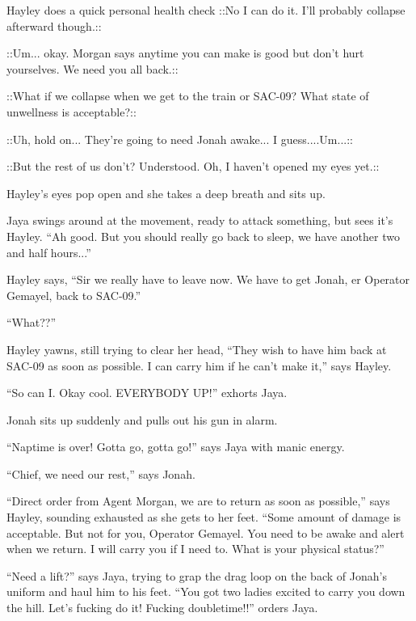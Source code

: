 Hayley does a quick personal health check  {\color[RGB]{230,145,56}::No I can do it.  I'll probably collapse afterward though.::}  {\color[RGB]{255,153,0} } 

 {\color[RGB]{153,0,255}::Um... okay.  Morgan says anytime you can make is good but don't hurt yourselves.  We need you all back.:: } 

 {\color[RGB]{230,145,56}::What if we collapse when we get to the train or SAC-09?  What state of unwellness is acceptable?::}  {\color[RGB]{255,153,0} } 

 {\color[RGB]{153,0,255}::Uh, hold on... They're going to need Jonah awake... I guess....Um...:: } 

 {\color[RGB]{230,145,56}::But the rest of us don't?  Understood.  Oh, I haven't opened my eyes yet.::}  {\color[RGB]{255,153,0} } 

Hayley's eyes pop open and she takes a deep breath and sits up.

Jaya swings around at the movement, ready to attack something, but sees it's Hayley.  ``Ah good. But you should really go back to sleep, we have another two and half hours...''

Hayley says, ``Sir we really have to leave now.  We have to get Jonah, er Operator Gemayel, back to SAC-09.''

``What??''

Hayley yawns, still trying to clear her head, ``They wish to have him back at SAC-09 as soon as possible.  I can carry him if he can't make it,'' says Hayley.

``So can I.  Okay cool.  EVERYBODY UP!'' exhorts Jaya.

Jonah sits up suddenly and pulls out his gun in alarm.

``Naptime is over!  Gotta go, gotta go!'' says Jaya with manic energy.

``Chief, we need our rest,'' says Jonah.

``Direct order from Agent Morgan, we are to return as soon as possible,'' says Hayley, sounding exhausted as she gets to her feet.  ``Some amount of damage is acceptable.  But not for you, Operator Gemayel.  You need to be awake and alert when we return.  I will carry you if I need to.  What is your physical status?''

``Need a lift?'' says Jaya, trying to grap the drag loop on the back of Jonah's uniform and haul him to his feet.  ``You got two ladies excited to carry you down the hill.  Let's fucking do it!   Fucking doubletime!!'' orders Jaya.

